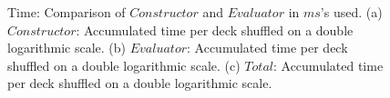 \documentclass[twoside,11pt,openright]{report}
\begin{document}
\begin{figure}
    \begin{subfigure}{\textwidth}
        \centering
        \caption{}
        \label{fig:total_ms_plot}
    \end{subfigure}

    \caption{Time: Comparison of $Constructor$ and $Evaluator$ in $ms$'s used. (a) $Constructor$: Accumulated time per deck shuffled on a double logarithmic scale. (b) $Evaluator$: Accumulated time per deck shuffled on a double logarithmic scale. (c) $Total$: Accumulated time per deck shuffled on a double logarithmic scale.}
    \label{fig:mesurement_ms}
\end{figure}
\end{document}
